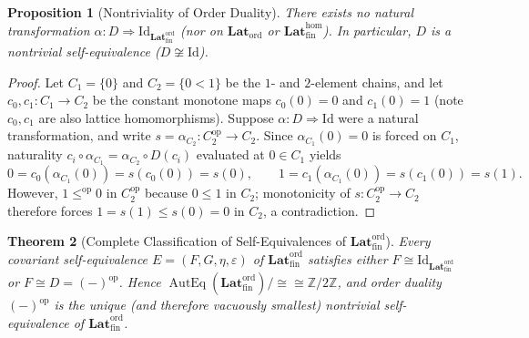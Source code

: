 \documentclass[11pt]{article}
\newtheorem{theorem}{Theorem}[section]
\newtheorem{proposition}[theorem]{Proposition}
\theoremstyle{definition}
\newcommand{\LatOrd}{\mathbf{Lat}_{\mathrm{ord}}}
\newcommand{\FinLatOrd}{\mathbf{Lat}_{\mathrm{fin}}^{\mathrm{ord}}}
\newcommand{\FinLatHom}{\mathbf{Lat}_{\mathrm{fin}}^{\mathrm{hom}}}
\newcommand{\Id}{\mathrm{Id}}
\newcommand{\op}{\mathrm{op}}
\begin{document}
\begin{proposition}[Nontriviality of Order Duality]
\label{prop:duality-nontrivial}
There exists no natural transformation $\alpha : D \Rightarrow \Id_{\FinLatOrd}$
(nor on $\LatOrd$ or $\FinLatHom$). In particular, $D$ is a nontrivial
self-equivalence ($D \not\cong \Id$).
\end{proposition}

\begin{proof}
Let $C_1 = \{0\}$ and $C_2 = \{0 < 1\}$ be the $1$- and $2$-element chains, and
let $c_0, c_1 : C_1 \to C_2$ be the constant monotone maps $c_0(0) = 0$ and
$c_1(0) = 1$ (note $c_0, c_1$ are also lattice homomorphisms). Suppose
$\alpha : D \Rightarrow \Id$ were a natural transformation, and write
$s = \alpha_{C_2} : C_2^{\op} \to C_2$. Since $\alpha_{C_1}(0) = 0$ is forced on
$C_1$, naturality $c_i \circ \alpha_{C_1} = \alpha_{C_2} \circ D(c_i)$ evaluated
at $0 \in C_1$ yields
\[
  0 = c_0(\alpha_{C_1}(0)) = s(c_0(0)) = s(0), \qquad
  1 = c_1(\alpha_{C_1}(0)) = s(c_1(0)) = s(1).
\]
However, $1 \le^{\op} 0$ in $C_2^{\op}$ because $0 \le 1$ in $C_2$; monotonicity
of $s : C_2^{\op} \to C_2$ therefore forces $1 = s(1) \le s(0) = 0$ in $C_2$, a
contradiction.
\end{proof}

\begin{theorem}[Complete Classification of Self-Equivalences of $\FinLatOrd$]
\label{thm:autoequiv-class}
Every covariant self-equivalence $E = (F, G, \eta, \varepsilon)$ of $\FinLatOrd$
satisfies either $F \cong \Id_{\FinLatOrd}$ or $F \cong D = (-)^{\op}$. Hence
$\operatorname{AutEq}(\FinLatOrd)/{\cong} \cong \mathbb{Z}/2\mathbb{Z}$, and
order duality $(-)^{\op}$ is the unique (and therefore vacuously smallest)
nontrivial self-equivalence of $\FinLatOrd$.
\end{theorem}
\end{document}
